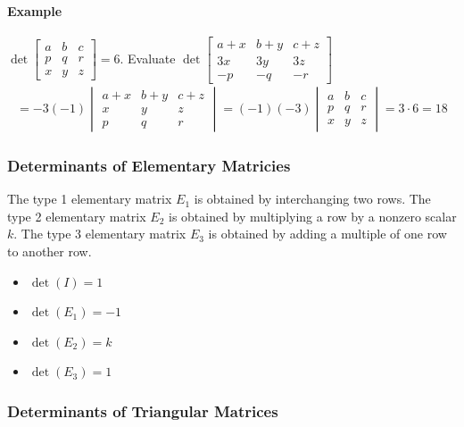 \paragraph*{Example}
$\det\begin{bmatrix}
    a & b & c \\
    p & q & r \\
    x & y & z
\end{bmatrix} = 6$. Evaluate $\det\begin{bmatrix}
    a + x & b + y & c + z \\
    3x & 3y & 3z \\
    -p & -q & -r
\end{bmatrix}$
\begin{align*}
    = -3 (-1) \begin{vmatrix}
        a + x & b + y & c + z \\
        x & y & z\\
        p & q & r
    \end{vmatrix}
    = (-1)(-3) \begin{vmatrix}
        a & b & c \\
        p & q & r \\
        x & y & z
    \end{vmatrix} = 3 \cdot 6 = 18
\end{align*}

\subsubsection*{Determinants of Elementary Matricies}
The type 1 elementary matrix $E_1$ is obtained by interchanging two rows.
The type 2 elementary matrix $E_2$ is obtained by multiplying a row by a nonzero scalar $k$.
The type 3 elementary matrix $E_3$ is obtained by adding a multiple of one row to another row.
\begin{itemize}
    \item $\det(I) = 1$
    \item $\det(E_1) = -1$
    \item $\det(E_2) = k$
    \item $\det(E_3) = 1$
\end{itemize}

\subsubsection*{Determinants of Triangular Matrices}
